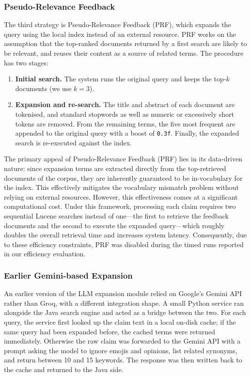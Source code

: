 \subsubsection{Pseudo-Relevance Feedback}

The third strategy is Pseudo-Relevance Feedback (PRF), which expands the query using the local index instead of an external resource. PRF works on the assumption that the top-ranked documents returned by a first search are likely to be relevant, and reuses their content as a source of related terms. The procedure has two stages:

\begin{enumerate}
    \item \textbf{Initial search.} The system runs the original query and keeps the top-$k$ documents (we use $k = 3$).
    \item \textbf{Expansion and re-search.} The title and abstract of each document are tokenised, and standard stopwords as well as numeric or excessively short tokens are removed. From the remaining terms, the five most frequent are appended to the original query with a boost of \texttt{0.3f}. Finally, the expanded search is re-executed against the index.
\end{enumerate}

The primary appeal of Pseudo-Relevance Feedback (PRF) lies in its data-driven nature: since expansion terms are extracted directly from the top-retrieved documents of the corpus, they are inherently guaranteed to be in-vocabulary for the index. This effectively mitigates the vocabulary mismatch problem without relying on external resources. However, this effectiveness comes at a significant computational cost. Under this framework, processing each claim requires two sequential Lucene searches instead of one—the first to retrieve the feedback documents and the second to execute the expanded query—which roughly doubles the overall retrieval time and increases system latency. Consequently, due to these efficiency constraints, PRF was disabled during the timed runs reported in our efficiency evaluation.
\subsubsection{Earlier Gemini-based Expansion}

An earlier version of the LLM expansion module relied on Google's Gemini API rather than Groq, with a different integration shape. A small Python service ran alongside the Java search engine and acted as a bridge between the two. For each query, the service first looked up the claim text in a local on-disk cache; if the same query had been expanded before, the cached terms were returned immediately. Otherwise the raw claim was forwarded to the Gemini API with a prompt asking the model to ignore emojis and opinions, list related synonyms, and return between 10 and 15 keywords. The response was then written back to the cache and returned to the Java side.

